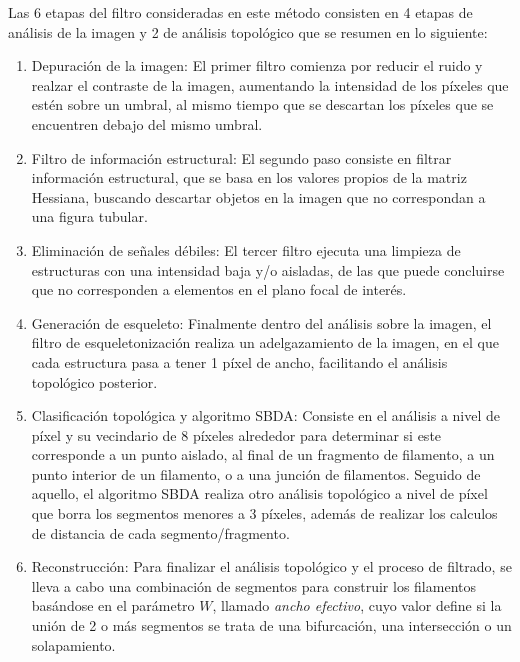 Las 6 etapas del filtro consideradas en este m\'etodo consisten en 4 etapas de an\'alisis de la imagen y 2 de an\'alisis topol\'ogico que se resumen en lo siguiente:

\begin{enumerate}
    \item Depuraci\'on de la imagen: El primer filtro comienza por reducir el ruido y realzar el contraste de la imagen, aumentando la intensidad de los p\'ixeles que est\'en sobre un umbral, al mismo tiempo que se descartan los p\'ixeles que se encuentren debajo del mismo umbral.
    \item Filtro de informaci\'on estructural: El segundo paso consiste en filtrar informaci\'on estructural, que se basa en los valores propios de la matriz Hessiana, buscando descartar objetos en la imagen que no correspondan a una figura tubular.
    \item Eliminaci\'on de se\~nales d\'ebiles: El tercer filtro ejecuta una limpieza de estructuras con una intensidad baja y/o aisladas, de las que puede concluirse que no corresponden a elementos en el plano focal de inter\'es.
    \item Generaci\'on de esqueleto: Finalmente dentro del an\'alisis sobre la imagen, el filtro de esqueletonizaci\'on realiza un adelgazamiento de la imagen, en el que cada estructura pasa a tener 1 p\'ixel de ancho, facilitando el an\'alisis topol\'ogico posterior.
    \item Clasificaci\'on topol\'ogica y algoritmo SBDA: Consiste en el an\'alisis a nivel de p\'ixel y su vecindario de 8 p\'ixeles alrededor para determinar si este corresponde a un punto aislado, al final de un fragmento de filamento, a un punto interior de un filamento, o a una junci\'on de filamentos. Seguido de aquello, el algoritmo SBDA realiza otro an\'alisis topol\'ogico a nivel de p\'ixel que borra los segmentos menores a 3 p\'ixeles, adem\'as de realizar los calculos de distancia de cada segmento/fragmento.
    \item Reconstrucci\'on: Para finalizar el an\'alisis topol\'ogico y el proceso de filtrado, se lleva a cabo una combinaci\'on de segmentos para construir los filamentos bas\'andose en el par\'ametro $W$, llamado \textit{ancho efectivo}, cuyo valor define si la uni\'on de 2 o m\'as segmentos se trata de una bifurcaci\'on, una intersecci\'on o un solapamiento. 
\end{enumerate}

